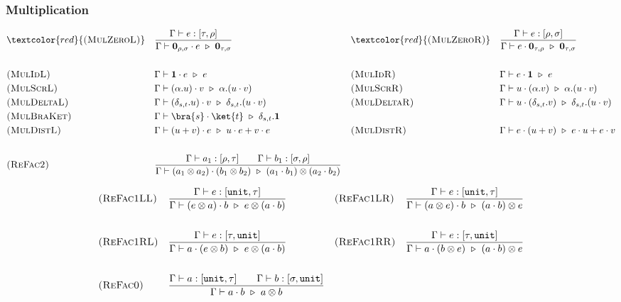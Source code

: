 
\subsubsection*{Multiplication}
\begin{align*}
  & \textcolor{red}{\textsc{(MulZeroL)}}
  && \frac{\Gamma \vdash e : [\tau, \rho]}{\Gamma \vdash \textbf{0}_{\rho, \sigma} \cdot e \reduce \textbf{0}_{\tau, \sigma}}
  && \textcolor{red}{\textsc{(MulZeroR)}}
  && \frac{\Gamma \vdash e : [\rho, \sigma]}{\Gamma \vdash e \cdot \textbf{0}_{\tau, \rho} \reduce \textbf{0}_{\tau, \sigma}} \\
  \\
  & \textsc{(MulIdL)} && \Gamma \vdash \mathbf{1} \cdot e \reduce e 
  && \textsc{(MulIdR)} && \Gamma \vdash e \cdot \mathbf{1} \reduce e 
  \\
  & \textsc{(MulScrL)} && \Gamma \vdash (\alpha.u) \cdot v \reduce \alpha.(u \cdot v)
  && \textsc{(MulScrR)} && \Gamma \vdash u \cdot (\alpha.v) \reduce \alpha.(u \cdot v)
  \\
  & \textsc{(MulDeltaL)} && \Gamma \vdash (\delta_{s, t}.u) \cdot v \reduce \delta_{s, t}.(u \cdot v)
  && \textsc{(MulDeltaR)} && \Gamma \vdash u \cdot (\delta_{s, t}.v) \reduce \delta_{s, t}.(u \cdot v)
  \\
  & \textsc{(MulBraKet)} && \Gamma \vdash \bra{s} \cdot \ket{t} \reduce \delta_{s, t}.\mathbf{1} \\ 
  & \textsc{(MulDistL)} && \Gamma \vdash (u + v) \cdot e \reduce u \cdot e + v \cdot e
  && \textsc{(MulDistR)} && \Gamma \vdash e \cdot (u + v) \reduce e \cdot u + e \cdot v \\
  \\
  & \textsc{(ReFac2)} && \frac{\Gamma \vdash a_1 : [\rho, \tau] \qquad \Gamma \vdash b_1 : [\sigma, \rho]}{\Gamma \vdash (a_1 \otimes a_2) \cdot (b_1 \otimes b_2) \reduce (a_1 \cdot b_1) \otimes (a_2 \cdot b_2)} \\
\end{align*}

\begin{align*}
  & \textsc{(ReFac1LL)} && \frac{\Gamma \vdash e : [\texttt{unit}, \tau]}{\Gamma \vdash (e \otimes a) \cdot b \ \triangleright\  e \otimes (a \cdot b)}
  && \textsc{(ReFac1LR)} && \frac{\Gamma \vdash e : [\texttt{unit}, \tau]}{\Gamma \vdash (a \otimes e) \cdot b \ \triangleright\  (a \cdot b) \otimes e} \\
  \\
  & \textsc{(ReFac1RL)} && \frac{\Gamma \vdash e : [\tau, \texttt{unit}]}{\Gamma \vdash a \cdot (e \otimes b) \ \triangleright\  e \otimes (a \cdot b)} 
  && \textsc{(ReFac1RR)} && \frac{\Gamma \vdash e : [\tau, \texttt{unit}]}{\Gamma \vdash a \cdot (b \otimes e) \ \triangleright\  (a \cdot b) \otimes e} \\
  \\
  & \textsc{(ReFac0)} && \frac{\Gamma \vdash a : [\texttt{unit}, \tau] \qquad \Gamma \vdash b : [\sigma, \texttt{unit}]}{\Gamma \vdash a \cdot b \ \triangleright\  a \otimes b}
\end{align*}

